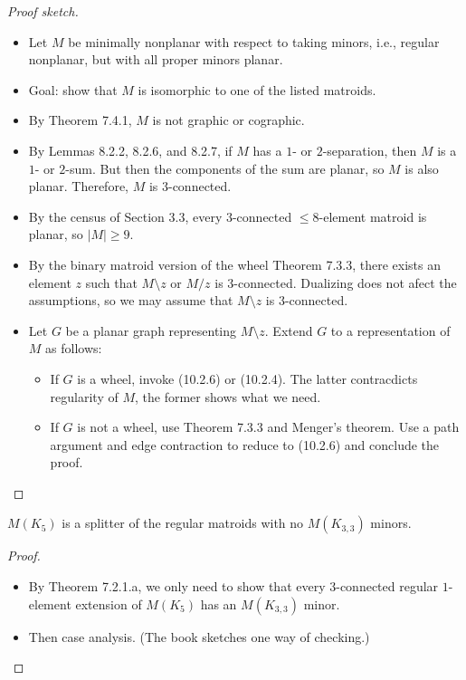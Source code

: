 \begin{proof}[Proof sketch]
  \begin{itemize}
    \item Let $M$ be minimally nonplanar with respect to taking minors, i.e., regular nonplanar, but with all proper minors planar.
    \item Goal: show that $M$ is isomorphic to one of the listed matroids.
    \item By Theorem 7.4.1, $M$ is not graphic or cographic.
    \item By Lemmas 8.2.2, 8.2.6, and 8.2.7, if $M$ has a $1$- or $2$-separation, then $M$ is a $1$- or $2$-sum. But then the components of the sum are planar, so $M$ is also planar. Therefore, $M$ is $3$-connected.
    \item By the census of Section 3.3, every $3$-connected $\leq 8$-element matroid is planar, so $|M| \geq 9$.
    \item By the binary matroid version of the wheel Theorem 7.3.3, there exists an element $z$ such that $M \setminus z$ or $M / z$ is $3$-connected. Dualizing does not afect the assumptions, so we may assume that $M \setminus z$ is $3$-connected.
    \item Let $G$ be a planar graph representing $M \setminus z$. Extend $G$ to a representation of $M$ as follows:
    \begin{itemize}
      \item If $G$ is a wheel, invoke (10.2.6) or (10.2.4). The latter contracdicts regularity of $M$, the former shows what we need.
      \item If $G$ is not a wheel, use Theorem 7.3.3 and Menger's theorem. Use a path argument and edge contraction to reduce to (10.2.6) and conclude the proof.
    \end{itemize}
  \end{itemize}
\end{proof}

\begin{lemma}[10.3.1]
  \label{lem:10.3.1}
  $M(K_5)$ is a splitter of the regular matroids with no $M(K_{3,3})$ minors.
\end{lemma}

\begin{proof}
  \begin{itemize}
    \item By Theorem 7.2.1.a, we only need to show that every $3$-connected regular $1$-element extension of $M(K_5)$ has an $M(K_{3,3})$ minor.
    \item Then case analysis. (The book sketches one way of checking.)
  \end{itemize}
\end{proof}

